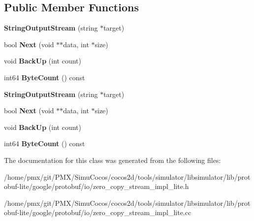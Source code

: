 \subsection*{Public Member Functions}
\begin{DoxyCompactItemize}
\item 
\mbox{\label{classgoogle_1_1protobuf_1_1io_1_1StringOutputStream_ad7aa5c58a0b3458ed0a9fe09c7086d31}} 
{\bfseries String\+Output\+Stream} (string $\ast$target)
\item 
\mbox{\label{classgoogle_1_1protobuf_1_1io_1_1StringOutputStream_ab18f5d23a16235e4661b9bce0bef06af}} 
bool {\bfseries Next} (void $\ast$$\ast$data, int $\ast$size)
\item 
\mbox{\label{classgoogle_1_1protobuf_1_1io_1_1StringOutputStream_ae84a94d5ce06b3666bdf9cef14ad43cd}} 
void {\bfseries Back\+Up} (int count)
\item 
\mbox{\label{classgoogle_1_1protobuf_1_1io_1_1StringOutputStream_a69b2765ef1123a9eb848feabf882f198}} 
int64 {\bfseries Byte\+Count} () const
\item 
\mbox{\label{classgoogle_1_1protobuf_1_1io_1_1StringOutputStream_ad7aa5c58a0b3458ed0a9fe09c7086d31}} 
{\bfseries String\+Output\+Stream} (string $\ast$target)
\item 
\mbox{\label{classgoogle_1_1protobuf_1_1io_1_1StringOutputStream_ab18f5d23a16235e4661b9bce0bef06af}} 
bool {\bfseries Next} (void $\ast$$\ast$data, int $\ast$size)
\item 
\mbox{\label{classgoogle_1_1protobuf_1_1io_1_1StringOutputStream_ae84a94d5ce06b3666bdf9cef14ad43cd}} 
void {\bfseries Back\+Up} (int count)
\item 
\mbox{\label{classgoogle_1_1protobuf_1_1io_1_1StringOutputStream_a69b2765ef1123a9eb848feabf882f198}} 
int64 {\bfseries Byte\+Count} () const
\end{DoxyCompactItemize}


The documentation for this class was generated from the following files\+:\begin{DoxyCompactItemize}
\item 
/home/pmx/git/\+P\+M\+X/\+Simu\+Cocos/cocos2d/tools/simulator/libsimulator/lib/protobuf-\/lite/google/protobuf/io/zero\+\_\+copy\+\_\+stream\+\_\+impl\+\_\+lite.\+h\item 
/home/pmx/git/\+P\+M\+X/\+Simu\+Cocos/cocos2d/tools/simulator/libsimulator/lib/protobuf-\/lite/google/protobuf/io/zero\+\_\+copy\+\_\+stream\+\_\+impl\+\_\+lite.\+cc\end{DoxyCompactItemize}
